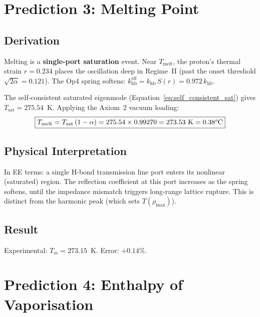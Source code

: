 \section{Prediction 3: Melting Point}

\subsection{Derivation}

Melting is a \textbf{single-port saturation} event. Near $T_\mathrm{melt}$, the proton's thermal strain $r = 0.234$ places the oscillation deep in Regime~II (past the onset threshold $\sqrt{2\alpha} = 0.121$). The Op4 spring softens: $k_\mathrm{hb}^\mathrm{eff} = k_\mathrm{hb}\,S(r) = 0.972\,k_\mathrm{hb}$.

The self-consistent saturated eigenmode (Equation~\ref{eq:self_consistent_sat}) gives $T_\mathrm{sat} = 275.54$~K. Applying the Axiom~2 vacuum loading:
\begin{equation}
\boxed{
    T_\mathrm{melt} = T_\mathrm{sat}\,(1-\alpha) = 275.54 \times 0.99270 = 273.53 \text{ K} = 0.38\text{\textdegree{}C}
}
\end{equation}

\subsection{Physical Interpretation}

In EE terms: a single H-bond transmission line port enters its nonlinear (saturated) region. The reflection coefficient at this port increases as the spring softens, until the impedance mismatch triggers long-range lattice rupture. This is distinct from the harmonic peak (which sets $T(\rho_\mathrm{max})$).

\subsection{Result}
Experimental: $T_m = 273.15$~K. \quad Error: $\mathbf{+0.14\%}$.


\section{Prediction 4: Enthalpy of Vaporisation}

